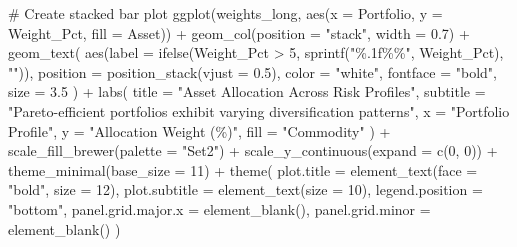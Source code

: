 \documentclass[
  10pt,
  a4paper,
]{article}
\newenvironment{Shaded}{\begin{snugshade}}{\end{snugshade}}
\newcommand{\AttributeTok}[1]{\textcolor[rgb]{0.40,0.45,0.13}{#1}}
\newcommand{\CommentTok}[1]{\textcolor[rgb]{0.37,0.37,0.37}{#1}}
\newcommand{\DecValTok}[1]{\textcolor[rgb]{0.68,0.00,0.00}{#1}}
\newcommand{\FloatTok}[1]{\textcolor[rgb]{0.68,0.00,0.00}{#1}}
\newcommand{\FunctionTok}[1]{\textcolor[rgb]{0.28,0.35,0.67}{#1}}
\newcommand{\NormalTok}[1]{\textcolor[rgb]{0.00,0.23,0.31}{#1}}
\newcommand{\SpecialCharTok}[1]{\textcolor[rgb]{0.37,0.37,0.37}{#1}}
\newcommand{\StringTok}[1]{\textcolor[rgb]{0.13,0.47,0.30}{#1}}
\begin{document}
\begin{Shaded}
\begin{Highlighting}[]
\CommentTok{\# Create stacked bar plot}
\FunctionTok{ggplot}\NormalTok{(weights\_long, }\FunctionTok{aes}\NormalTok{(}\AttributeTok{x =}\NormalTok{ Portfolio, }\AttributeTok{y =}\NormalTok{ Weight\_Pct, }\AttributeTok{fill =}\NormalTok{ Asset)) }\SpecialCharTok{+}
  \FunctionTok{geom\_col}\NormalTok{(}\AttributeTok{position =} \StringTok{"stack"}\NormalTok{, }\AttributeTok{width =} \FloatTok{0.7}\NormalTok{) }\SpecialCharTok{+}
  \FunctionTok{geom\_text}\NormalTok{(}
    \FunctionTok{aes}\NormalTok{(}\AttributeTok{label =} \FunctionTok{ifelse}\NormalTok{(Weight\_Pct }\SpecialCharTok{\textgreater{}} \DecValTok{5}\NormalTok{, }\FunctionTok{sprintf}\NormalTok{(}\StringTok{"\%.1f\%\%"}\NormalTok{, Weight\_Pct), }\StringTok{""}\NormalTok{)),}
    \AttributeTok{position =} \FunctionTok{position\_stack}\NormalTok{(}\AttributeTok{vjust =} \FloatTok{0.5}\NormalTok{),}
    \AttributeTok{color =} \StringTok{"white"}\NormalTok{,}
    \AttributeTok{fontface =} \StringTok{"bold"}\NormalTok{,}
    \AttributeTok{size =} \FloatTok{3.5}
\NormalTok{  ) }\SpecialCharTok{+}
  \FunctionTok{labs}\NormalTok{(}
    \AttributeTok{title =} \StringTok{"Asset Allocation Across Risk Profiles"}\NormalTok{,}
    \AttributeTok{subtitle =} \StringTok{"Pareto{-}efficient portfolios exhibit varying diversification patterns"}\NormalTok{,}
    \AttributeTok{x =} \StringTok{"Portfolio Profile"}\NormalTok{,}
    \AttributeTok{y =} \StringTok{"Allocation Weight (\%)"}\NormalTok{,}
    \AttributeTok{fill =} \StringTok{"Commodity"}
\NormalTok{  ) }\SpecialCharTok{+}
  \FunctionTok{scale\_fill\_brewer}\NormalTok{(}\AttributeTok{palette =} \StringTok{"Set2"}\NormalTok{) }\SpecialCharTok{+}
  \FunctionTok{scale\_y\_continuous}\NormalTok{(}\AttributeTok{expand =} \FunctionTok{c}\NormalTok{(}\DecValTok{0}\NormalTok{, }\DecValTok{0}\NormalTok{)) }\SpecialCharTok{+}
  \FunctionTok{theme\_minimal}\NormalTok{(}\AttributeTok{base\_size =} \DecValTok{11}\NormalTok{) }\SpecialCharTok{+}
  \FunctionTok{theme}\NormalTok{(}
    \AttributeTok{plot.title =} \FunctionTok{element\_text}\NormalTok{(}\AttributeTok{face =} \StringTok{"bold"}\NormalTok{, }\AttributeTok{size =} \DecValTok{12}\NormalTok{),}
    \AttributeTok{plot.subtitle =} \FunctionTok{element\_text}\NormalTok{(}\AttributeTok{size =} \DecValTok{10}\NormalTok{),}
    \AttributeTok{legend.position =} \StringTok{"bottom"}\NormalTok{,}
    \AttributeTok{panel.grid.major.x =} \FunctionTok{element\_blank}\NormalTok{(),}
    \AttributeTok{panel.grid.minor =} \FunctionTok{element\_blank}\NormalTok{()}
\NormalTok{  )}
\end{Highlighting}
\end{Shaded}
\end{document}
